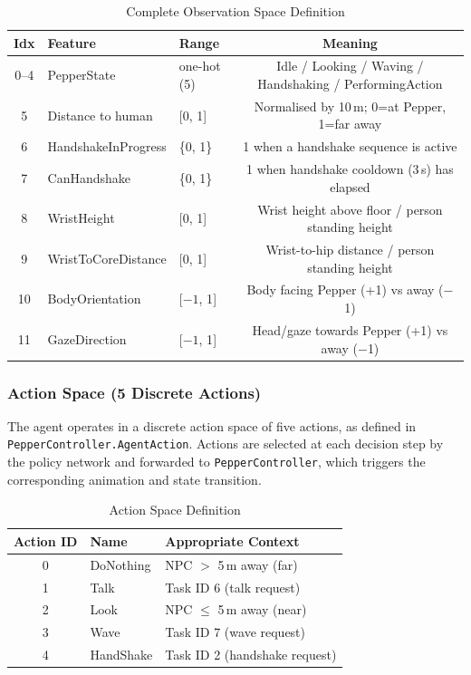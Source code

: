 \documentclass[../report.tex]{subfiles}
\begin{document}
    \begin{table}[t]
        \centering
        \caption{Complete Observation Space Definition}
        \label{tab:obs}
        \begin{tabular}{cllc}
            \toprule
            \textbf{Idx} & \textbf{Feature} & \textbf{Range} & \textbf{Meaning} \\
            \midrule
            0--4 & PepperState & one-hot (5) & Idle / Looking / Waving / Handshaking / PerformingAction \\
            5 & Distance to human & {[}0, 1{]} & Normalised by 10\,m; 0=at Pepper, 1=far away \\
            6 & HandshakeInProgress & \{0, 1\} & 1 when a handshake sequence is active \\
            7 & CanHandshake & \{0, 1\} & 1 when handshake cooldown (3\,s) has elapsed \\
            8 & WristHeight & {[}0, 1{]} & Wrist height above floor / person standing height \\
            9 & WristToCoreDistance & {[}0, 1{]} & Wrist-to-hip distance / person standing height \\
            10 & BodyOrientation & {[}$-1$, 1{]} & Body facing Pepper (+1) vs away ($-$1) \\
            11 & GazeDirection & {[}$-1$, 1{]} & Head/gaze towards Pepper (+1) vs away ($-$1) \\
            \bottomrule
        \end{tabular}
    \end{table}

    \subsubsection{Action Space (5 Discrete Actions)}

    The agent operates in a discrete action space of five actions, as defined in \texttt{PepperController.AgentAction}. Actions are selected at each decision step by the policy network and forwarded to \texttt{PepperController}, which triggers the corresponding animation and state transition.

    \begin{table}[H]
        \centering
        \caption{Action Space Definition}
        \label{tab:actions}
        \begin{tabular}{cll}
            \toprule
            \textbf{Action ID} & \textbf{Name} & \textbf{Appropriate Context} \\
            \midrule
            0 & DoNothing & NPC $>$ 5\,m away (far) \\
            1 & Talk & Task ID 6 (talk request) \\
            2 & Look & NPC $\leq$ 5\,m away (near) \\
            3 & Wave & Task ID 7 (wave request) \\
            4 & HandShake & Task ID 2 (handshake request) \\
            \bottomrule
        \end{tabular}
    \end{table}
\end{document}

